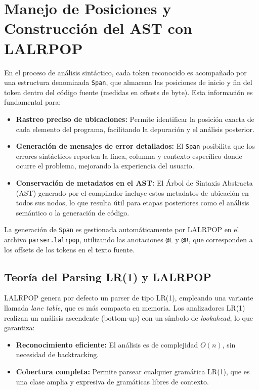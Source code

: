 \documentclass[a4paper,12pt]{article}
\begin{document}
\section{Manejo de Posiciones y Construcción del AST con LALRPOP}

En el proceso de análisis sintáctico, cada token reconocido es acompañado por una estructura denominada \texttt{Span}, que almacena las posiciones de inicio y fin del token dentro del código fuente (medidas en offsets de byte). Esta información es fundamental para:

\begin{itemize}
    \item \textbf{Rastreo preciso de ubicaciones:} Permite identificar la posición exacta de cada elemento del programa, facilitando la depuración y el análisis posterior.
    \item \textbf{Generación de mensajes de error detallados:} El \texttt{Span} posibilita que los errores sintácticos reporten la línea, columna y contexto específico donde ocurre el problema, mejorando la experiencia del usuario.
    \item \textbf{Conservación de metadatos en el AST:} El Árbol de Sintaxis Abstracta (AST) generado por el compilador incluye estos metadatos de ubicación en todos sus nodos, lo que resulta útil para etapas posteriores como el análisis semántico o la generación de código.
\end{itemize}

La generación de \texttt{Span} es gestionada automáticamente por LALRPOP en el archivo \texttt{parser.lalrpop}, utilizando las anotaciones \texttt{@L} y \texttt{@R}, que corresponden a los offsets de los tokens en el texto fuente.

\subsection*{Teoría del Parsing LR(1) y LALRPOP}

LALRPOP genera por defecto un parser de tipo LR(1), empleando una variante llamada \emph{lane table}, que es más compacta en memoria. Los analizadores LR(1) realizan un análisis ascendente (bottom-up) con un símbolo de \emph{lookahead}, lo que garantiza:

\begin{itemize}
    \item \textbf{Reconocimiento eficiente:} El análisis es de complejidad $O(n)$, sin necesidad de backtracking.
    \item \textbf{Cobertura completa:} Permite parsear cualquier gramática LR(1), que es una clase amplia y expresiva de gramáticas libres de contexto.
\end{itemize}
\end{document}
